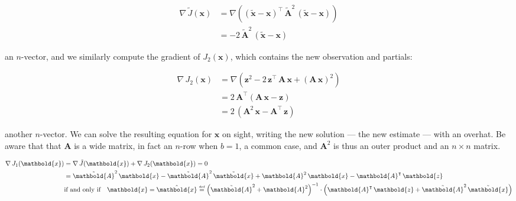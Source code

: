 \documentclass[10pt,oneside,x11names]{article}
\begin{document}
\begin{align*}
\nabla{}\,
{\tilde{J}}(\mathbold{x}) &=
\nabla{}
\left(
(\tilde{\mathbold{x}}-\mathbold{x})^\intercal\,
{\tilde{\mathbold{A}}^2}\,
(\tilde{\mathbold{x}}-\mathbold{x})
\right) \\ &=
-2\,
{\tilde{\mathbold{A}}^2}\,
(\tilde{\mathbold{x}}-\mathbold{x})
\end{align*}

\noindent an \mbox{$n$-vector}, and we similarly compute the gradient of
\(J_2(\mathbold{x})\), which contains the new observation and partials:

\begin{align*}
\nabla\,
J_2(\mathbold{x})
&=
\nabla
\left(
\mathbold{z}^2 -
2\,
\mathbold{z}^\intercal\,
\mathbold{A}\,
\mathbold{x} +
\left(
\mathbold{A}\,
\mathbold{x}
\right)^2
\right)
\\
&=
2\,
\mathbold{A}^\intercal
\left(
\mathbold{A}\,
\mathbold{x} -
\mathbold{z}
\right)
\\
&=
2\,
\left(
\mathbold{A}^2\,
\mathbold{x}-
\mathbold{A}^\intercal\,
\mathbold{z}
\right)
\end{align*}

\noindent another \mbox{$n$-vector}. We can solve the resulting equation for
\(\mathbold{x}\) on sight, writing the new solution --- the new estimate ---
with an overhat. Be aware that
that \(\mathbold{A}\) is a wide matrix, in fact   an \mbox{$n$-row} when \(b=1\), a
common case, and 
\(\mathbold{A}^2\) is thus an outer product and an \(n\times{n}\) matrix.


\begin{align}
\notag
\nabla{}\,
J_1(\mathbold{x}) 
&= 
\nabla{}\,
{\tilde{J}}
(\mathbold{x}) + 
\nabla{}\,
J_2(\mathbold{x}) 
= 0
\\
\notag
&=
{\tilde{\mathbold{A}}}^2\,
\mathbold{x} -
{\tilde{\mathbold{A}}}^2\,
{\tilde{\mathbold{x}}} +
\mathbold{A}^2\,
\mathbold{x} - 
\mathbold{A}^\intercal{}\,
\mathbold{z}
\\
\label{eqn:def-of-posterior-estimate}
&
\text{if and only if}\quad
\mathbold{x}=\hat{\mathbold{x}}
\stackrel{\text{\tiny def}}{=}
\left(
{\tilde{\mathbold{A}}}^2 + 
\mathbold{A}^2
\right)^{-1}
\cdot
\left(
\mathbold{A}^\intercal\,
\mathbold{z} + 
{\tilde{\mathbold{A}}}^2\,
{\tilde{\mathbold{x}}}
\right)
\end{align}
\end{document}
